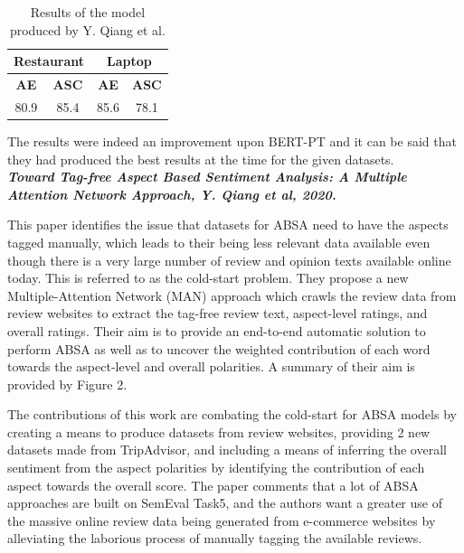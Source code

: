 \documentclass[conference]{IEEEtran}
\begin{document}
\begin{table}[htbp]
\caption{Results of the model produced by Y. Qiang et al.}
\begin{center}
\begin{tabular}{|c|c|c|c|}
\hline
\multicolumn{2}{|c|}{\textbf{Restaurant}} & \multicolumn{2}{|c|}{\textbf{Laptop}} \\
\hline
\textbf{AE} & \textbf{ASC} & \textbf{AE} & \textbf{ASC} \\
\hline
80.9 & 85.4 & 85.6 & 78.1 \\
\hline
\end{tabular}
\end{center}
\end{table}


The results were indeed an improvement upon BERT-PT and it can be said that they had produced the best results at the time for the given datasets.\\

\textit{\textbf{Toward Tag-free Aspect Based Sentiment Analysis:
A Multiple Attention Network Approach, Y. Qiang et al, 2020.}}

This paper identifies the issue that datasets for ABSA need to have the aspects tagged manually, which leads to their being less relevant data available even though there is a very large number of review and opinion texts available online today. This is referred to as the cold-start problem. They propose a new Multiple-Attention Network (MAN) approach which crawls the review data from review websites to extract the tag-free review text, aspect-level ratings, and overall ratings. Their aim is to provide an end-to-end automatic solution to perform ABSA as well as to uncover the weighted contribution of each word towards the aspect-level and overall polarities. A summary of their aim is provided by Figure 2.

The contributions of this work are combating the cold-start for ABSA models by creating a means to produce datasets from review websites, providing 2 new datasets made from TripAdvisor, and including a means of inferring the overall sentiment from the aspect polarities by identifying the contribution of each aspect towards the overall score. The paper comments that a lot of ABSA approaches are built on SemEval Task5, and the authors want a greater use of the massive online review data being generated from e-commerce websites by alleviating the laborious process of manually tagging the available reviews.
\end{document}
